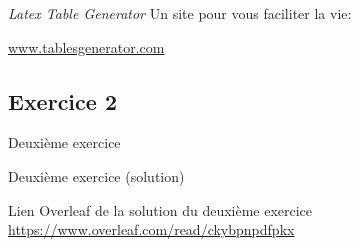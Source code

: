 \begin{frame}[fragile]{\textit{Latex Table Generator}}
  Un site pour vous faciliter la vie:
  \begin{center}
    \url{www.tablesgenerator.com}
  \end{center}
  \begin{center}
  \end{center}
\end{frame}
\subsection{Exercice 2}

\begin{frame}[fragile]{Deuxième exercice}
  \begin{center}
  \end{center}  
\end{frame}

\begin{frame}[fragile]{Deuxième exercice (solution)}
  \begin{center}
  Lien Overleaf de la solution du deuxième exercice \url{https://www.overleaf.com/read/ckybpnpdfpkx}
  \end{center}
\end{frame}
